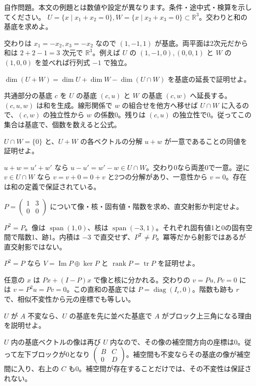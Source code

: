 \documentclass[11pt]{article}
\begin{document}
自作問題。本文の例題とは数値や設定が異なります。条件・途中式・検算を示してください。
\problem[平面の交わり]
$U=\{x\mid x_1+x_2=0\},W=\{x\mid x_2+x_3=0\}\subset\mathbb R^3$。交わりと和の基底を求めよ。
\begin{ans}
交わりは $x_1=-x_2,x_3=-x_2$ なので $(1,-1,1)$ が基底。両平面は2次元だから和は $2+2-1=3$ 次元で $\mathbb R^3$。例えば $U$ の $(1,-1,0),(0,0,1)$ と $W$ の $(1,0,0)$ を並べれば行列式 $-1$ で独立。
\end{ans}
\problem[次元公式の証明]
$\dim(U+W)=\dim U+\dim W-\dim(U\cap W)$ を基底の延長で証明せよ。
\begin{ans}
共通部分の基底 $c$ を $U$ の基底 $(c,u)$ と $W$ の基底 $(c,w)$ へ延長する。$(c,u,w)$ は和を生成。線形関係で $w$ の組合せを他方へ移せば $U\cap W$ に入るので、$(c,w)$ の独立性から $w$ の係数0。残りは $(c,u)$ の独立性で0。従ってこの集合は基底で、個数を数えると公式。
\end{ans}
\newpage
\problem[直和の一意性]
$U\cap W=\{0\}$ と、$U+W$ の各ベクトルの分解 $u+w$ が一意であることの同値を証明せよ。
\begin{ans}
$u+w=u\prime+w\prime$ なら $u-u\prime=w\prime-w\in U\cap W$。交わり0なら両差0で一意。逆に $v\in U\cap W$ なら $v=v+0=0+v$ と2つの分解があり、一意性から $v=0$。存在は和の定義で保証されている。
\end{ans}
\problem[斜めの射影]
$P=\begin{pmatrix}1&3\\0&0\end{pmatrix}$ について像・核・固有値・階数を求め、直交射影か判定せよ。
\begin{ans}
$P^2=P$。像は $\operatorname{span}(1,0)$、核は $\operatorname{span}(-3,1)$。それぞれ固有値1と0の固有空間で階数1、跡1。内積は $-3$ で直交せず、$P^{\mathsf T}\ne P$。冪等だから射影ではあるが直交射影ではない。
\end{ans}
\newpage
\problem[冪等行列の分解]
$P^2=P$ なら $V=\operatorname{Im}P\oplus\ker P$ と $\operatorname{rank}P=\operatorname{tr}P$ を証明せよ。
\begin{ans}
任意の $x$ は $Px+(I-P)x$ で像と核に分かれる。交わりの $v=Pu,Pv=0$ には $v=P^2u=Pv=0$。この直和の基底では $P=\operatorname{diag}(I_r,0)$。階数も跡も $r$ で、相似不変性から元の座標でも等しい。
\end{ans}
\problem[不変部分空間]
$U$ が $A$ 不変なら、$U$ の基底を先に並べた基底で $A$ がブロック上三角になる理由を説明せよ。
\begin{ans}
$U$ 内の基底ベクトルの像は再び $U$ 内なので、その像の補空間方向の座標は0。従って左下ブロックが0となり $\begin{pmatrix}B&C\\0&D\end{pmatrix}$。補空間も不変ならその基底の像が補空間に入り、右上の $C$ も0。補空間が存在することだけでは、その不変性は保証されない。
\end{ans}
\end{document}
